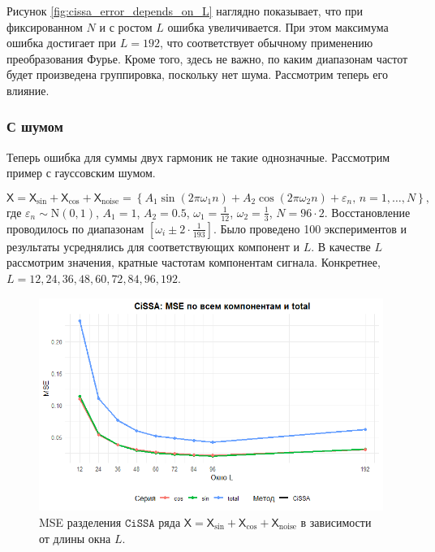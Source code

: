 \documentclass[12pt, specialist, subf
]{disser}
\theoremstyle{definition}
\newcommand{\CISSA}{\texttt{CiSSA}}
\newcommand{\TS}{\mathsf{X}}
\begin{document}
Рисунок \ref{fig:cissa_error_depends_on_L} наглядно показывает, что при фиксированном $N$ и с ростом $L$ ошибка увеличивается. При этом максимума ошибка достигает при $L = 192$, что соответствует обычному применению преобразования Фурье. Кроме того, здесь не важно, по каким диапазонам частот будет произведена группировка, поскольку нет шума. Рассмотрим теперь его влияние.


\subsubsection*{С шумом}

Теперь ошибка для суммы двух гармоник не такие однозначные. Рассмотрим пример с гауссовским шумом.

\[
\TS = \TS_{\sin} + \TS_{\cos} +\TS_{\mathrm{noise}} = \left\{  
A_1 \sin(2\pi \omega_1 n ) + A_2  \cos(2\pi \omega_2 n ) + \varepsilon_n, \, n = 1, \dots, N
\right\},
\] где $\varepsilon_n \sim \mathrm N(0, 1)$, $A_1 = 1$, $A_2 = 0.5$, $\omega_1 = \frac{1}{12}$, $\omega_2 = \frac{1}{3}$, $N = 96 \cdot 2$. Восстановление проводилось по диапазонам $[\omega_i \pm 2 \cdot \frac{1}{193}]$. Было проведено 100 экспериментов и результаты усреднялись для соответствующих компонент и $L$. В качестве $L$ рассмотрим значения, кратные частотам компонентам сигнала. Конкретнее,  $L = 12, 24, 36, 48, 60, 72, 84, 96, 192$.


\begin{figure}[H]
	\centering
	\includegraphics[width=1\textwidth]{img/cissa_errors_plot_cos_noised.png}
	\caption{MSE разделения $\CISSA$ ряда $\TS = \TS_{\sin} + \TS_{\cos} +\TS_{\mathrm{noise}}$ в зависимости от длины окна $L$.}
	\label{fig:cissa_error_cos_noised_depends_on_L}
\end{figure}
\end{document}

